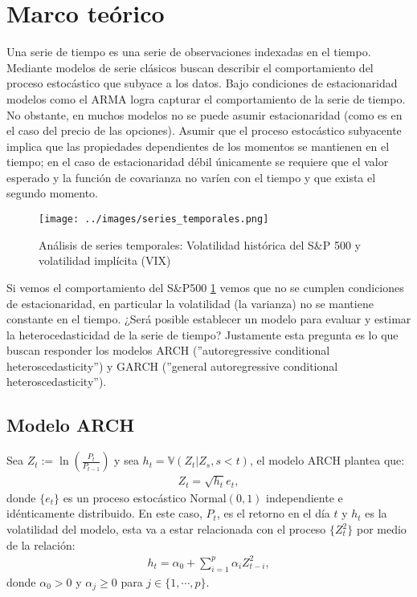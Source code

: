 \section{Marco teórico}

Una serie de tiempo es una serie de observaciones indexadas en el tiempo. Mediante modelos de serie clásicos buscan describir el comportamiento del proceso estocástico que subyace a los datos. Bajo condiciones de estacionaridad modelos como el ARMA logra capturar el comportamiento de la serie de tiempo. No obstante, en muchos modelos no se puede asumir estacionaridad (como es en el caso del precio de las opciones). Asumir que el proceso estocástico subyacente implica que las propiedades dependientes de los momentos se mantienen en el tiempo; en el caso de estacionaridad débil únicamente se requiere que el valor esperado y la función de covarianza no varíen con el tiempo y que exista el segundo momento.
\newline

\begin{figure}[hbt!]
    \centering
    \texttt{[image: ../images/series\_temporales.png]}
    \caption{Análisis de series temporales: Volatilidad histórica del S\&P 500 y volatilidad
  implícita (VIX)}
        \label{fig:series_temporales}   
\end{figure}

Si vemos el comportamiento del S\&P500 \ref{fig:series_temporales} vemos que no se cumplen condiciones de estacionaridad, en particular la volatilidad (la varianza) no se mantiene constante en el tiempo. ¿Será posible establecer un modelo para evaluar y estimar la heterocedasticidad de la serie de tiempo? Justamente esta pregunta es lo que buscan responder los modelos ARCH (''autoregressive conditional heteroscedasticity'') y GARCH (''general autoregressive conditional heteroscedasticity''). 
\newpage
\subsection{Modelo ARCH}
Sea $Z_t:= \ln\left(\frac{P_t}{P_{t-1}}\right)$ y sea $h_t= \mathbb{V}\left(Z_t|Z_s,s<t\right)$, el modelo ARCH plantea que: 
\begin{align*}
    Z_t = \sqrt{h_t} e_{t},
\end{align*}
donde $\{e_t\}$ es un proceso estocástico Normal$(0,1)$ independiente e idénticamente distribuido. En este caso, $P_t$, es el retorno en el día $t$ y $h_t$ es la volatilidad del modelo, esta va a estar relacionada con el proceso $\{Z_t^2\}$ por medio de la relación: 
\begin{align*}
    h_t = \alpha_0 + \sum_{i=1}^{p} \alpha_i Z_{t-i}^2,
\end{align*}
donde $\alpha_0>0$ y $\alpha_j\geq 0$ para $j\in \{1,\cdots,p\}$.
